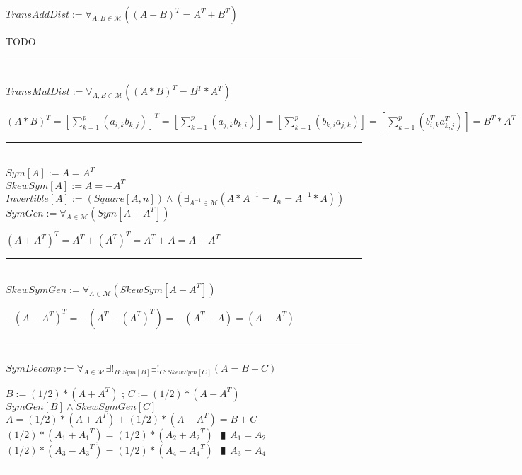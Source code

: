 \documentclass{book}
\newcommand{\abr}{:=}
\newcommand{\pipe}{$\phantom{(}\vrectangleblack\phantom{)}$}
\begin{document}
$TransAddDist \abr \forall_{A, B \in \mathcal{M}}((A + B)^T = A^T + B ^T)$
\begin{enumerate}
  \lit TODO
\end{enumerate} \vspace{.75mm} \hrule \vspace{.75mm} \ \\ 

$TransMulDist \abr \forall_{A, B \in \mathcal{M}}((A * B)^T = B^T * A^T)$
\begin{enumerate}
  \lit $(A * B)^T = \left[\sum_{k = 1}^{p}(a_{i, k} b_{k, j})\right]^T = \left[\sum_{k = 1}^{p}(a_{j, k} b_{k, i})\right] = \left[\sum_{k = 1}^{p}(b_{k, i} a_{j, k})\right] =  \left[\sum_{k = 1}^{p}(b^T_{i, k} a^T_{k, j})\right] = B^T * A^T$
\end{enumerate} \vspace{.75mm} \hrule \vspace{.75mm} \ \\

$Sym[A] \abr A = A^T$ \\
$SkewSym[A] \abr A = -A^T$ \\
$Invertible[A] \abr (Square[A, n]) \land (\exists_{A^{-1} \in \mathcal{M}}(A * A^{-1} = I_n = A^{-1} * A))$ \\

$SymGen \abr \forall_{A \in \mathcal{M}}(Sym[A + A^T])$
\begin{enumerate}
  \lit $(A + A^T)^T = A^T + (A^T)^T = A^T + A = A + A^T$
\end{enumerate} \vspace{.75mm} \hrule \vspace{.75mm} \ \\ 

$SkewSymGen \abr \forall_{A \in \mathcal{M}}(SkewSym[A - A^T])$
\begin{enumerate}
  \lit $-(A - A^T)^T = -(A^T - (A^T)^T) = -(A^T - A) = (A - A^T)$
\end{enumerate} \vspace{.75mm} \hrule \vspace{.75mm} \ \\ 

$SymDecomp \abr \forall_{A \in \mathcal{M}} \exists!_{B : Sym[B]} \exists!_{C : SkewSym[C]}(A = B + C)$
\begin{enumerate}
  \lit $B \abr (1 / 2) * (A + A^T)$ ; $C \abr (1 / 2) * (A - A^T)$
  \lit $SymGen[B] \land SkewSymGen[C]$
  \lit $A = (1 / 2) * (A + A^T) + (1 / 2) * (A - A^T) = B + C$
  \lit $(1 / 2) * (A_1 + {A_1}^T) = (1 / 2) * (A_2 + {A_2}^T)$ \pipe $A_1 = A_2$
  \lit $(1 / 2) * (A_3 - {A_3}^T) = (1 / 2) * (A_4 - {A_4}^T)$ \pipe $A_3 = A_4$
\end{enumerate} \vspace{.75mm} \hrule \vspace{.75mm} \ \\ 
\end{document}

